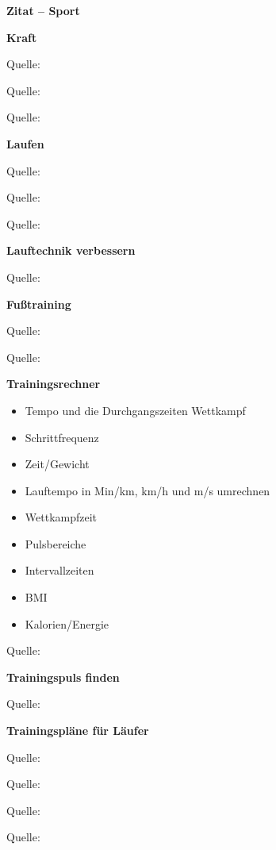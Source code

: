 \textbf{Zitat -- Sport}

\textbf{Kraft}

Quelle: ~\textcite{lauren:2014:fit90tage}

Quelle: ~\textcite{lauren:2016:fitkraftstoff}

Quelle: ~\textcite{lauren:2017:fit}

\textbf{Laufen}

Quelle: ~\textcite{marquardt:2015:laufbibel}

Quelle: ~\textcite{steffny:2006:laufbuch}

Quelle: ~\textcite{zeller:2017:hindernis}

\textbf{Lauftechnik verbessern}

Quelle: ~\textcite{marquardt:2018:laufstil}

\textbf{Fußtraining}

Quelle: ~\textcite{marquardt:2018:fusstraining}

Quelle: ~\textcite{marquardt:2018:fusstrainingsplan}

\textbf{Trainingsrechner}

\begin{itemize}
\item
  Tempo und die Durchgangszeiten Wettkampf
\item
  Schrittfrequenz
\item
  Zeit/Gewicht
\item
  Lauftempo in Min/km, km/h und m/s umrechnen
\item
  Wettkampfzeit
\item
  Pulsbereiche
\item
  Intervallzeiten
\item
  BMI
\item
  Kalorien/Energie
\end{itemize}

Quelle: ~\textcite{marquardt:2018:trainingsrechner}

\textbf{Trainingspuls finden}

Quelle: ~\textcite{marquardt:2018:pulspace}

\textbf{Trainingspläne für Läufer}

Quelle: ~\textcite{marquardt:2018:trainingsplan5km}

Quelle: ~\textcite{marquardt:2018:trainingsplan10km}

Quelle: ~\textcite{marquardt:2018:trainingsplan21km}

Quelle: ~\textcite{marquardt:2018:trainingsplan42km}

